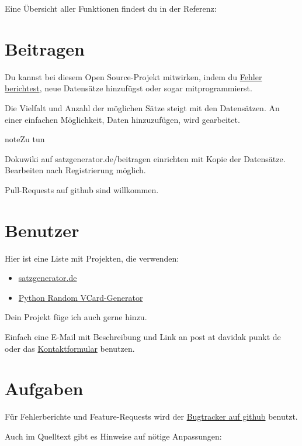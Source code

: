 \documentclass[a4paper,12pt,oneside]{sphinxmanual}
\begin{document}
Eine Übersicht aller Funktionen findest du in der Referenz:  


\chapter{Beitragen}
\label{beitragen:beitragen}\label{beitragen::doc}
Du kannst bei diesem Open Source-Projekt mitwirken, indem du \href{https://github.com/davidak/pyzufall/issues/}{Fehler berichtest}, neue Datensätze hinzufügst oder sogar mitprogrammierst.

Die Vielfalt und Anzahl der möglichen Sätze steigt mit den Datensätzen. An einer einfachen Möglichkeit, Daten hinzuzufügen, wird gearbeitet.

\begin{notice}{note}{Zu tun}

Dokuwiki auf satzgenerator.de/beitragen einrichten mit Kopie der Datensätze. Bearbeiten nach Registrierung möglich.
\end{notice}

Pull-Requests auf github sind willkommen.


\chapter{Benutzer}
\label{benutzer::doc}\label{benutzer:benutzer}
Hier ist eine Liste mit Projekten, die  verwenden:
\begin{itemize}
\item {} 
\href{http://satzgenerator.de/}{satzgenerator.de}

\item {} 
\href{https://github.com/davidak/python-random-vcard-generator}{Python Random VCard-Generator}

\end{itemize}

Dein Projekt füge ich auch gerne hinzu.

Einfach eine E-Mail mit Beschreibung und Link an post at davidak punkt de oder das \href{http://davidak.de/kontakt}{Kontaktformular} benutzen.


\chapter{Aufgaben}
\label{todo::doc}\label{todo:aufgaben}
Für Fehlerberichte und Feature-Requests wird der \href{https://github.com/davidak/pyzufall/issues}{Bugtracker auf github} benutzt.

Auch im Quelltext gibt es Hinweise auf nötige Anpassungen:
\end{document}
